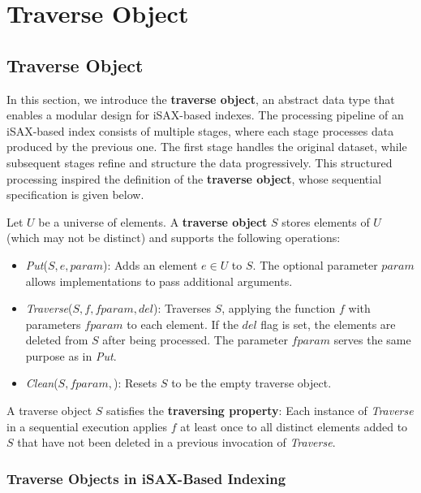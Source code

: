 \chapter{Traverse Object}
\label{chapter:traverse-object}

\section{Traverse Object}

In this section, we introduce the \textbf{traverse object}, an abstract data type
that enables a modular design for iSAX-based indexes. The processing pipeline of
an iSAX-based index consists of multiple stages, where each stage processes data
produced by the previous one. The first stage handles the original dataset, while
subsequent stages refine and structure the data progressively. This structured
processing inspired the definition of the \textbf{traverse object}, whose
sequential specification is given below.
% 
\begin{definition}
\label{def:traverse}
Let $U$ be a universe of elements. A \textbf{traverse object} $S$ stores elements
of $U$ (which may not be distinct) and supports the following operations:

\begin{itemize}
    \item \textit{Put}($S,e,\mathit{param}$): Adds an element $e \in U$ to $S$.
    The optional parameter $\mathit{param}$ allows implementations to pass
    additional arguments.
    
    \item \textit{Traverse}($S,f,\mathit{fparam},del$): Traverses $S$, applying
    the function $f$ with parameters $\mathit{fparam}$ to each element. If the
    $del$ flag is set, the elements are deleted from $S$ after being processed.
    The parameter $\mathit{fparam}$ serves the same purpose as in \textit{Put}.

    \item \textit{Clean}($S,\mathit{fparam},$): Resets $S$ to be the empty traverse
    object.
\end{itemize}
% 
A traverse object $S$ satisfies the \textbf{traversing property}:  
Each instance of \textit{Traverse} in a sequential execution applies $f$ at
least once to all distinct elements added to $S$ that have not been deleted
in a previous invocation of \textit{Traverse}.
\end{definition}

\subsection{Traverse Objects in iSAX-Based Indexing}

